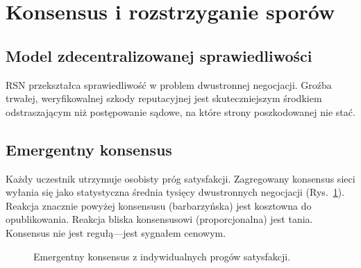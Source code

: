\documentclass[11pt,a4paper,twocolumn]{article}
\begin{document}
\section{Konsensus i rozstrzyganie sporów}

\subsection{Model zdecentralizowanej sprawiedliwości}

RSN przekształca sprawiedliwość w problem dwustronnej negocjacji. Groźba trwałej, weryfikowalnej szkody reputacyjnej jest skuteczniejszym środkiem odstraszającym niż postępowanie sądowe, na które strony poszkodowanej nie stać.

\subsection{Emergentny konsensus}

Każdy uczestnik utrzymuje osobisty próg satysfakcji. Zagregowany konsensus sieci wyłania się jako statystyczna średnia tysięcy dwustronnych negocjacji (Rys.~\ref{fig:consensus}). Reakcja znacznie powyżej konsensusu (barbarzyńska) jest kosztowna do opublikowania. Reakcja bliska konsensusowi (proporcjonalna) jest tania. Konsensus nie jest regułą---jest sygnałem cenowym.

\begin{figure}[ht]
\centering
{}
\caption{Emergentny konsensus z indywidualnych progów satysfakcji.}
\label{fig:consensus}
\end{figure}
\end{document}
